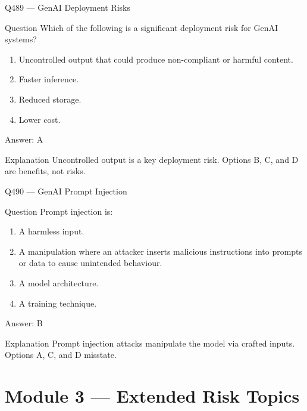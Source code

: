\documentclass[aspectratio=169,8pt]{beamer}
\begin{document}
	\begin{frame}{Q489 --- GenAI Deployment Risks}
		\begin{block}{Question}
			Which of the following is a significant deployment risk for GenAI systems?
			\begin{enumerate}
				\item Uncontrolled output that could produce non-compliant or harmful content.
				\item Faster inference.
				\item Reduced storage.
				\item Lower cost.
			\end{enumerate}
		\end{block}
		\begin{exampleblock}{Answer: A}\end{exampleblock}
		\begin{block}{Explanation}
			Uncontrolled output is a key deployment risk. Options B, C, and D are benefits, not risks.
		\end{block}
	\end{frame}
	
	\begin{frame}{Q490 --- GenAI Prompt Injection}
		\begin{block}{Question}
			Prompt injection is:
			\begin{enumerate}
				\item A harmless input.
				\item A manipulation where an attacker inserts malicious instructions into prompts or data to cause unintended behaviour.
				\item A model architecture.
				\item A training technique.
			\end{enumerate}
		\end{block}
		\begin{exampleblock}{Answer: B}\end{exampleblock}
		\begin{block}{Explanation}
			Prompt injection attacks manipulate the model via crafted inputs. Options A, C, and D misstate.
		\end{block}
	\end{frame}
	
	\section{Module 3 --- Extended Risk Topics}
	
\end{document}
